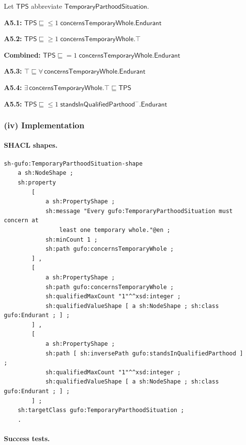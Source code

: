 \documentclass[12pt,a4paper]{article}
\begin{document}
Let $\mathsf{TPS}$ abbreviate $\mathsf{TemporaryParthoodSituation}$.

\textbf{A5.1:}
$\mathsf{TPS} \sqsubseteq {\leq}1\;\mathsf{concernsTemporaryWhole}.\mathsf{Endurant}$

\textbf{A5.2:}
$\mathsf{TPS} \sqsubseteq {\geq}1\;\mathsf{concernsTemporaryWhole}.\top$

\textbf{Combined:}
$\mathsf{TPS} \sqsubseteq {=}1\;\mathsf{concernsTemporaryWhole}.\mathsf{Endurant}$

\textbf{A5.3:}
$\top \sqsubseteq \forall\,\mathsf{concernsTemporaryWhole}.\mathsf{Endurant}$

\textbf{A5.4:}
$\exists\,\mathsf{concernsTemporaryWhole}.\top \sqsubseteq \mathsf{TPS}$

\textbf{A5.5:}
$\mathsf{TPS} \sqsubseteq {\leq}1\;\mathsf{standsInQualifiedParthood}^{-}.\mathsf{Endurant}$

\subsubsection*{(iv) Implementation}

\paragraph{SHACL shapes.}

\begin{lstlisting}[style=turtlestyle]
sh-gufo:TemporaryParthoodSituation-shape
    a sh:NodeShape ;
    sh:property
        [
            a sh:PropertyShape ;
            sh:message "Every gufo:TemporaryParthoodSituation must concern at
                least one temporary whole."@en ;
            sh:minCount 1 ;
            sh:path gufo:concernsTemporaryWhole ;
        ] ,
        [
            a sh:PropertyShape ;
            sh:path gufo:concernsTemporaryWhole ;
            sh:qualifiedMaxCount "1"^^xsd:integer ;
            sh:qualifiedValueShape [ a sh:NodeShape ; sh:class gufo:Endurant ; ] ;
        ] ,
        [
            a sh:PropertyShape ;
            sh:path [ sh:inversePath gufo:standsInQualifiedParthood ] ;
            sh:qualifiedMaxCount "1"^^xsd:integer ;
            sh:qualifiedValueShape [ a sh:NodeShape ; sh:class gufo:Endurant ; ] ;
        ] ;
    sh:targetClass gufo:TemporaryParthoodSituation ;
    .
\end{lstlisting}

\paragraph{Success tests.}
\end{document}
